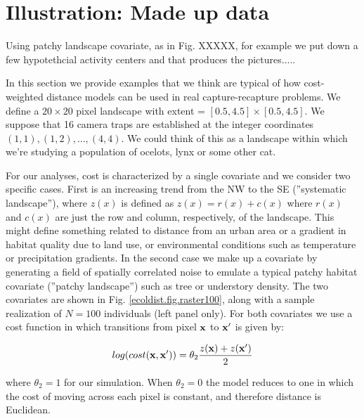 \section{Illustration: Made up data}

Using patchy landscape covariate, as in Fig. XXXXX, for example we put
down a few hypotethcial activity centers and that produces the pictures.....



In this section we provide examples that we think are typical of how
cost-weighted distance models can be used in real capture-recapture
problems.  We define a $20 \times 20$ pixel landscape with 
extent = $[0.5, 4.5] \times [0.5, 4.5]$.  
We suppose that 16 camera traps are established at the integer coordinates
$(1,1), (1,2), \ldots, (4,4)$. We could think of this as a landscape
within which we're studying a population of ocelots, lynx or some
other cat.

For our analyses, cost is characterized by a single covariate 
and we consider two specific cases. First is an increasing trend from
the NW to the SE (''systematic landscape''), where $z(x)$ is defined as
$z(x) = r(x) + c(x)$ where $r(x)$ and $c(x)$ are just the row and
column, respectively, of the landscape.  This might define something
related to distance from an urban area or a gradient in habitat
quality due to land use, or environmental conditions such as
temperature or precipitation gradients.  In the second case we make up
a covariate by generating a field of spatially correlated noise to
emulate a typical patchy habitat covariate (''patchy landscape'') such as
tree or understory density. The two covariates are shown in
Fig. \ref{ecoldist.fig.raster100}, along with a sample realization of
$N=100$ individuals (left panel only).  For both covariates we use a
cost function in which transitions from pixel ${\bf x}$ to ${\bf x}'$
is given by:

\[
 log(cost({\bf x},{\bf x}'))=  \theta_2 \frac{z({\bf x}) + z({\bf x}')}{2}
\]

{\flushleft where} $\theta_2 = 1$ for our simulation.
When $\theta_2=0$ the
model reduces to one in which the cost of moving across each pixel is
constant, and therefore distance is Euclidean.


